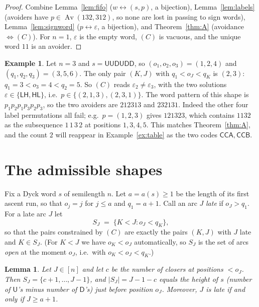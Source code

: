 \documentclass[11pt]{article}
\newtheorem{lemma}[theorem]{Lemma}
\theoremstyle{definition}
\newtheorem{example}[theorem]{Example}
\theoremstyle{remark}
\newcommand{\Av}{\operatorname{Av}}
\newcommand{\sU}{\mathsf{U}}
\newcommand{\sD}{\mathsf{D}}
\newcommand{\sL}{\mathsf{L}}
\newcommand{\sH}{\mathsf{H}}
\newcommand{\sA}{\mathsf{A}}
\newcommand{\sB}{\mathsf{B}}
\newcommand{\sC}{\mathsf{C}}
\begin{document}
\begin{proof}
Combine Lemma~\ref{lem:fifo} ($w\leftrightarrow(s,p)$, a bijection),
Lemma~\ref{lem:labels} (avoiders have $p\in\Av(132,312)$, so none are lost
in passing to sign words), Lemma~\ref{lem:signword}
($p\leftrightarrow\varepsilon$, a bijection), and Theorem~\ref{thm:A}
(avoidance $\iff(C)$). For $n=1$, $\varepsilon$ is the empty word, $(C)$ is
vacuous, and the unique word $11$ is an avoider.
\end{proof}

\begin{example}\label{ex:n3}
Let $n=3$ and $s=\sU\sU\sD\sU\sD\sD$, so $(o_1,o_2,o_3)=(1,2,4)$ and
$(q_1,q_2,q_3)=(3,5,6)$. The only pair $(K,J)$ with $q_1<o_J<q_K$ is
$(2,3)$: $q_1=3<o_3=4<q_2=5$. So $(C)$ reads
$\varepsilon_2\neq\varepsilon_3$, with the two solutions
$\varepsilon\in\{\sL\sH,\sH\sL\}$, i.e.\ $p\in\{(2,1,3),(2,3,1)\}$. The word
pattern of this shape is $p_1p_2p_1p_3p_2p_3$, so the two avoiders are
$212313$ and $232131$. Indeed the other four label permutations all fail;
e.g.\ $p=(1,2,3)$ gives $121323$, which contains $1132$ as the subsequence
$1\,1\,3\,2$ at positions $1,3,4,5$. This matches Theorem~\ref{thm:A}, and
the count $2$ will reappear in Example~\ref{ex:table} as the two codes
$\sC\sC\sA,\sC\sC\sB$.
\end{example}

\section{The admissible shapes}\label{sec:shapes}

Fix a Dyck word $s$ of semilength $n$. Let $a=a(s)\ge1$ be the length of its
first ascent run, so that $o_j=j$ for $j\le a$ and $q_1=a+1$. Call an arc
$J$ \emph{late} if $o_J>q_1$. For a late arc $J$ let
\[
  S_J \;=\; \{K<J : o_J<q_K\},
\]
so that the pairs constrained by $(C)$ are exactly the pairs $(K,J)$ with
$J$ late and $K\in S_J$. (For $K<J$ we have $o_K<o_J$ automatically, so
$S_J$ is the set of arcs \emph{open} at the moment $o_J$, i.e.\ with
$o_K<o_J<q_K$.)

\begin{lemma}\label{lem:interval}
Let $J\in[n]$ and let $c$ be the number of closers at positions $<o_J$.
Then $S_J=\{c+1,\dots,J-1\}$, and $|S_J|=J-1-c$ equals the height of $s$
(number of $\sU$'s minus number of $\sD$'s) just before position $o_J$.
Moreover, $J$ is late if and only if $J\ge a+1$.
\end{lemma}
\end{document}
